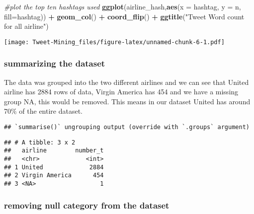 \documentclass[
]{article}
\newenvironment{Shaded}{\begin{snugshade}}{\end{snugshade}}
\newcommand{\CommentTok}[1]{\textcolor[rgb]{0.56,0.35,0.01}{\textit{#1}}}
\newcommand{\DataTypeTok}[1]{\textcolor[rgb]{0.13,0.29,0.53}{#1}}
\newcommand{\KeywordTok}[1]{\textcolor[rgb]{0.13,0.29,0.53}{\textbf{#1}}}
\newcommand{\NormalTok}[1]{#1}
\newcommand{\OperatorTok}[1]{\textcolor[rgb]{0.81,0.36,0.00}{\textbf{#1}}}
\newcommand{\StringTok}[1]{\textcolor[rgb]{0.31,0.60,0.02}{#1}}
\begin{document}
\begin{Shaded}
\begin{Highlighting}[]
\CommentTok{#plot the top ten hashtags used}
  \KeywordTok{ggplot}\NormalTok{(airline_hash,}\KeywordTok{aes}\NormalTok{(}\DataTypeTok{x =}\NormalTok{ hashtag, }\DataTypeTok{y =}\NormalTok{ n, }\DataTypeTok{fill=}\NormalTok{hashtag)) }\OperatorTok{+}\StringTok{ }\KeywordTok{geom_col}\NormalTok{() }\OperatorTok{+}\StringTok{ }\KeywordTok{coord_flip}\NormalTok{() }\OperatorTok{+}\StringTok{ }\KeywordTok{ggtitle}\NormalTok{(}\StringTok{"Tweet Word count for all airline"}\NormalTok{)}
\end{Highlighting}
\end{Shaded}

\texttt{[image: Tweet-Mining\_files/figure-latex/unnamed-chunk-6-1.pdf]}

\hypertarget{summarizing-the-dataset}{%
\subsubsection{summarizing the dataset}\label{summarizing-the-dataset}}

The data was grouped into the two different airlines and we can see that
United airline has 2884 rows of data, Virgin America has 454 and we have
a missing group NA, this would be removed. This means in our dataset
United has around 70\% of the entire dataset.

\begin{Shaded}
\end{Shaded}

\begin{verbatim}
## `summarise()` ungrouping output (override with `.groups` argument)
\end{verbatim}

\begin{verbatim}
## # A tibble: 3 x 2
##   airline        number_t
##   <chr>             <int>
## 1 United             2884
## 2 Virgin America      454
## 3 <NA>                  1
\end{verbatim}

\hypertarget{removing-null-category-from-the-dataset}{%
\subsubsection{removing null category from the
dataset}\label{removing-null-category-from-the-dataset}}
\end{document}
